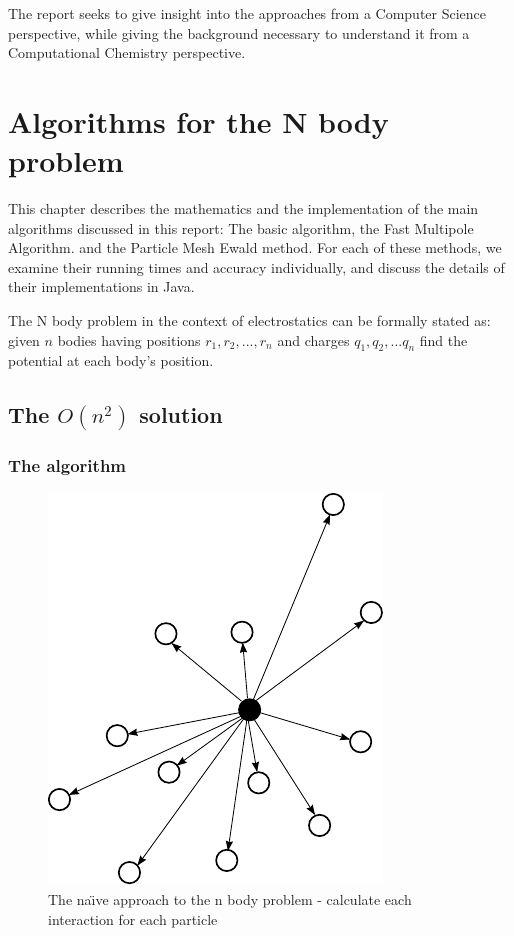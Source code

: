 \documentclass[pdftex,twoside,a4paper]{report}
\newcommand{\bcen}{\begin{center}}
\newcommand{\ecen}{\end{center}}
\newcommand{\pmem}{Particle Mesh Ewald method}
\newcommand{\fma}{Fast Multipole Algorithm}
\begin{document}
    The report seeks to give insight into the approaches from a Computer Science perspective, while giving the background necessary to understand it from a Computational Chemistry perspective.
    
    
    

\chapter{Algorithms for the N body problem}
This chapter describes the mathematics and the implementation of the main algorithms discussed in this report: The basic algorithm, the \fma{}. and the \pmem{}. For each of these methods, we examine their running times and accuracy individually, and discuss the details of their implementations in Java.

The N body problem in the context of electrostatics can be formally stated as: given $n$ bodies having positions $r_1,r_2,...,r_n$ and charges $q_1,q_2,...q_n$ find the potential at each body's position.
\section{The $O(n^2)$ solution}
\subsection{The algorithm}
        
\begin{figure}
\bcen \includegraphics{figures/nbodies.pdf} \ecen
\caption{The na\"{\i}ve approach to the n body problem - calculate each interaction for each particle}
\label{fig:basic_alg_diag}
\end{figure}
\end{document}
